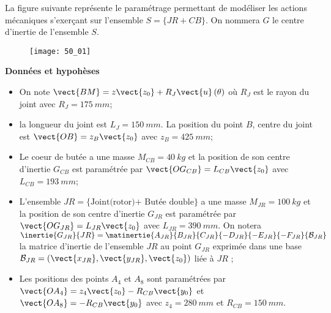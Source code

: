 \normaltrue \difficilefalse \tdifficilefalse
\correctionfalse


\setcounter{question}{0}
\ifcorrection
\else
{}
\fi




\ifprof
\else
La figure suivante représente le paramétrage permettant de modéliser les actions mécaniques
s’exerçant sur l’ensemble $S=\{JR+CB\}$. On nommera $G$ le centre d’inertie de l’ensemble
$S$.


\begin{figure}[H]
\centering
\texttt{[image: 50\_01]}
\end{figure}
\fi

\textbf{Données et hypohèses}

\begin{itemize}
\item On note $\vect{BM}=z\vect{z_0}+R_J\vect{u}\left(\theta\right)$ où $R_J$ est le rayon du joint avec $R_J = \SI{175}{mm}$;
\item la longueur du joint est $L_J = \SI{150}{mm}$. La position du point $B$, centre du joint est $\vect{OB}=z_B\vect{z_0}$ avec $z_B = \SI{425}{mm}$;
\item Le coeur de butée a une masse $M_{CB} = \SI{40}{kg}$ et la position de son centre d’inertie $G_{CB}$ est paramétrée par $\vect{OG_{CB}}= L_{CB}\vect{z_0}$ avec $L_{CB} = \SI{193}{mm}$;
\item L’ensemble $JR=\{\text{Joint(rotor)+ Butée double}\}$ a une masse $M_{JR} = \SI{100}{kg}$ et la
position de son centre d’inertie $G_{JR}$ est paramétrée par $\vect{OG_{JR}}=L_{JR}\vect{z_0}$ avec $L_{JR}=
\SI{390}{mm}$. On notera $\inertie{G_{JR}}{JR} = \matinertie{A_{JR}}{B_{JR}}{C_{JR}}{-D_{JR}}{-E_{JR}}{-F_{JR}}{\mathcal{B}_{JR}}$ la matrice d’inertie de l’ensemble $JR$ au point $G_{JR}$ exprimée dans une base $\mathcal{B}_{JR} = \left(\vect{x_{JR}},\vect{y_{JR}},\vect{z_{0}}\right)$ liée à $JR$ ;
\item Les positions des points $A_4$ et $A_8$ sont paramétrées par $\vect{OA_4} = z_4\vect{z_0}-R_{CB}\vect{y_0}$ et
$\vect{OA_8}=-R_{CB}\vect{y_0}$ avec $z_4 = \SI{280}{mm}$ et $R_{CB}=\SI{150}{mm}$.
\end{itemize}




